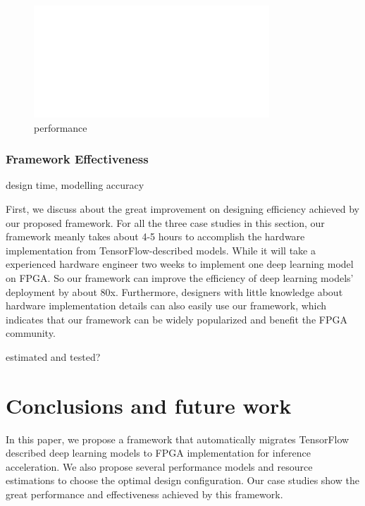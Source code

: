 \documentclass{acm_proc_article-sp-copy}
\begin{document}
\begin{figure}
	\centering
	\includegraphics[width=1.0\linewidth]{./figure/blank.jpg}
	\caption{performance}
	\label{ee}
\end{figure}

\subsubsection{Framework Effectiveness}

design time, modelling accuracy

First, we discuss about the great improvement on designing efficiency achieved by our proposed framework. For all the three case studies in this section, our framework meanly takes about 4-5 hours to accomplish the hardware implementation from TensorFlow-described models. While it will take a experienced hardware engineer two weeks to implement one deep learning model on FPGA. So our framework can improve the efficiency of deep learning models' deployment by about 80x. Furthermore, designers with little knowledge about hardware implementation details can also easily use our framework, which indicates that our framework can be widely popularized and benefit the FPGA community.

estimated and tested?


\section{Conclusions and future work}
In this paper, we propose a framework that automatically migrates TensorFlow described deep learning models to FPGA implementation for inference acceleration. We also propose several performance models and resource estimations to choose the optimal design configuration. Our case studies show the great performance and effectiveness achieved by this framework.
\end{document}
